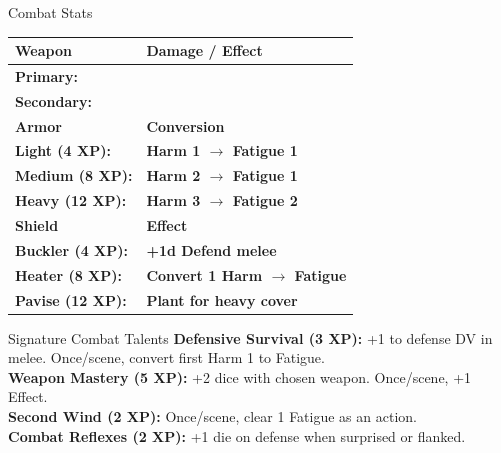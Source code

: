 \documentclass[10pt]{article}
\begin{document}
\begin{minipage}[t]{0.48\linewidth}
    \vspace{0.5em}
    
    \begin{charbox}{Combat Stats}
        \begin{tabular}{>{\bfseries}p{3cm} >{\bfseries}p{4.5cm}}
            \toprule
            \textbf{Weapon} & \textbf{Damage / Effect} \\
            \midrule
            Primary: & \underline{\hspace{4cm}} \\
            Secondary: & \underline{\hspace{4cm}} \\
            \midrule
            \textbf{Armor} & \textbf{Conversion} \\
            Light (4 XP): & Harm 1 $\rightarrow$ Fatigue 1 \\
            Medium (8 XP): & Harm 2 $\rightarrow$ Fatigue 1 \\
            Heavy (12 XP): & Harm 3 $\rightarrow$ Fatigue 2 \\
            \midrule
            \textbf{Shield} & \textbf{Effect} \\
            Buckler (4 XP): & +1d Defend melee \\
            Heater (8 XP): & Convert 1 Harm $\rightarrow$ Fatigue \\
            Pavise (12 XP): & Plant for heavy cover \\
            \bottomrule
        \end{tabular}
    \end{charbox}
    
    \vspace{0.5em}
    
    \begin{charbox}{Signature Combat Talents}
        \textbf{Defensive Survival (3 XP):} +1 to defense DV in melee. Once/scene, convert first Harm 1 to Fatigue.\\
        \textbf{Weapon Mastery (5 XP):} +2 dice with chosen weapon. Once/scene, +1 Effect.\\
        \textbf{Second Wind (2 XP):} Once/scene, clear 1 Fatigue as an action.\\
        \textbf{Combat Reflexes (2 XP):} +1 die on defense when surprised or flanked.
    \end{charbox}
\end{minipage}
\hfill
\end{document}
